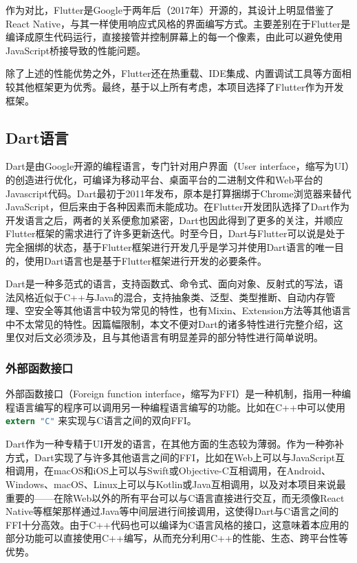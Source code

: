 作为对比，Flutter是Google于两年后（2017年）开源的，其设计上明显借鉴了React Native，与其一样使用响应式风格的界面编写方式。主要差别在于Flutter是编译成原生代码运行，直接接管并控制屏幕上的每一个像素，由此可以避免使用JavaScript桥接导致的性能问题。

除了上述的性能优势之外，Flutter还在热重载、IDE集成、内置调试工具等方面相较其他框架更为优秀。最终，基于以上所有考虑，本项目选择了Flutter作为开发框架。

\subsection{Dart语言}\label{subsec:dart}

Dart是由Google开源的编程语言，专门针对用户界面（User interface，缩写为UI）的创造进行优化，可编译为移动平台、桌面平台的二进制文件和Web平台的Javascript代码\cite{DartProgrammingLanguage}。Dart最初于2011年发布，原本是打算捆绑于Chrome浏览器来替代JavaScript，但后来由于各种因素而未能成功。在Flutter开发团队选择了Dart作为开发语言之后，两者的关系便愈加紧密，Dart也因此得到了更多的关注，并顺应Flutter框架的需求进行了许多更新迭代。时至今日，Dart与Flutter可以说是处于完全捆绑的状态，基于Flutter框架进行开发几乎是学习并使用Dart语言的唯一目的，使用Dart语言也是基于Flutter框架进行开发的必要条件。

Dart是一种多范式的语言，支持函数式、命令式、面向对象、反射式的写法，语法风格近似于C++与Java的混合，支持抽象类、泛型、类型推断、自动内存管理、空安全等其他语言中较为常见的特性，也有Mixin、Extension方法等其他语言中不太常见的特性。因篇幅限制，本文不便对Dart的诸多特性进行完整介绍，这里仅对后文必须涉及，且与其他语言有明显差异的部分特性进行简单说明。

\subsubsection{外部函数接口}\label{subsubsec:ffi}

外部函数接口（Foreign function interface，缩写为FFI）是一种机制，指用一种编程语言编写的程序可以调用另一种编程语言编写的功能。比如在C++中可以使用 \lstinline[language=C]{extern "C"} 来实现与C语言之间的双向FFI。

Dart作为一种专精于UI开发的语言，在其他方面的生态较为薄弱。作为一种弥补方式，Dart实现了与许多其他语言之间的FFI，比如在Web上可以与JavaScript互相调用，在macOS和iOS上可以与Swift或Objective-C互相调用，在Android、Windows、macOS、Linux上可以与Kotlin或Java互相调用，以及对本项目来说最重要的——在除Web以外的所有平台可以与C语言直接进行交互，而无须像React Native等框架那样通过Java等中间层进行间接调用，这使得Dart与C语言之间的FFI十分高效。由于C++代码也可以编译为C语言风格的接口，这意味着本应用的部分功能可以直接使用C++编写，从而充分利用C++的性能、生态、跨平台性等优势。

